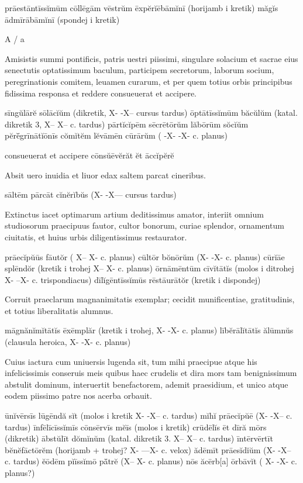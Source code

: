 \documentclass[a5paper,twoside]{article}
\begin{document}
prāestāntīssĭmūm cōllēgām vēstrŭm
ēxpĕrĭēbāmĭnī (horijamb i kretik)
măgĭs ādmīrābāmĭnī (spondej i kretik)


A / a

Amisistis 
	summi pontificis, patris uestri piissimi, singulare solacium 
	et sacrae eius senectutis optatissimum baculum, 
	participem secretorum, 
	laborum socium, 
	peregrinationis comitem, 
	leuamen curarum, 
	et per quem 
		totius orbis principibus 
		fidissima responsa 
		et reddere consueuerat 
		et accipere. 

sīngŭlārĕ sōlācĭŭm (dikretik, X- -X-- cursus tardus)
ōptātīssĭmūm băcŭlŭm (katal. dikretik 3, X-- X-- c. tardus)
pārtĭcĭpēm sēcrētōrŭm
lăbōrūm sŏcĭŭm
pĕrē̆grīnātĭōnīs cŏmĭtĕm
lĕvāmēn cūrārŭm ( -X- -X- c. planus)

consueuerat et accipere
cōnsŭēvĕrăt ĕt āccĭpĕrĕ

Absit uero inuidia 
et liuor edax saltem parcat cineribus.

sāltēm pārcāt cĭnĕrĭbŭs (X- -X--- cursus tardus)

Extinctus iacet optimarum artium deditissimus amator, 
interiit omnium studiosorum praecipuus fautor, 
cultor bonorum, 
curiae splendor, 
ornamentum ciuitatis, 
et huius urbis diligentissimus restaurator.

prāecĭpŭūs fāutŏr ( X-- X- c. planus)
cūltōr bŏnōrŭm (X- -X- c. planus)
cūrĭāe splēndŏr (kretik i trohej X-- X- c. planus)
ōrnāmēntūm cīvĭtātĭs (molos i ditrohej X- --X- c. trispondiacus)
dīlĭgēntīssĭmūs rēstāurātŏr (kretik i dispondej) 

Corruit praeclarum magnanimitatis exemplar; 
cecidit munificentiae, 
	gratitudinis, 
	et totius liberalitatis alumnus. 

māgnănĭmĭtātĭs ēxēmplăr (kretik i trohej, X- -X- c. planus)
lībĕrālĭtātĭs ălūmnŭs (clausula heroica, X- -X- c. planus)

Cuius iactura cum uniuersis lugenda sit, 
	tum mihi praecipue 
	atque his infelicissimis conseruis meis 
		quibus haec crudelis et dira mors 
			tam benignissimum abstulit dominum, 
			interuertit benefactorem, 
			ademit praesidium, 
			et unico atque eodem piissimo patre 
				nos acerba orbauit. 

ūnĭvērsīs lūgēndă sĭt (molos i kretik X- -X-- c. tardus)
mĭhĭ prāecĭpŭē (X- -X-- c. tardus)
īnfēlīcīssĭmīs cōnsērvīs mĕīs (molos i kretik)
crūdēlĭs ēt dīră mōrs (dikretik)
ābstŭlīt dŏmĭnŭm (katal. dikretik 3. X-- X-- c. tardus)
īntērvērtīt bĕnĕfāctōrĕm (horijamb + trohej? X- ---X- c. velox)
ădēmīt prāesĭdĭŭm (X- -X-- c. tardus)
ĕōdēm pĭīssĭmō pā̆trĕ (X-- X- c. planus)
nōs ăcērb[a] ōrbāvĭt ( X- -X- c. planus?)
\end{document}
